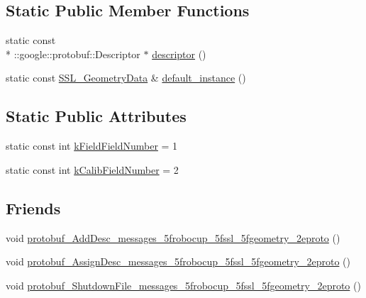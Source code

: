 \subsection*{Static Public Member Functions}
\begin{DoxyCompactItemize}
\item 
static const \\*
\-::google\-::protobuf\-::\-Descriptor $\ast$ \hyperlink{class_s_s_l___geometry_data_a5ea714e17439fd819f87feb567dd0407}{descriptor} ()
\item 
static const \hyperlink{class_s_s_l___geometry_data}{S\-S\-L\-\_\-\-Geometry\-Data} \& \hyperlink{class_s_s_l___geometry_data_a39d6ebf2bf5ca82eacc9150760e9e4fb}{default\-\_\-instance} ()
\end{DoxyCompactItemize}
\subsection*{Static Public Attributes}
\begin{DoxyCompactItemize}
\item 
static const int \hyperlink{class_s_s_l___geometry_data_abc32e65a2a8215fb1c280f4be9dfd3da}{k\-Field\-Field\-Number} = 1
\item 
static const int \hyperlink{class_s_s_l___geometry_data_a62bb45095c6621b4e36730ffcd7377de}{k\-Calib\-Field\-Number} = 2
\end{DoxyCompactItemize}
\subsection*{Friends}
\begin{DoxyCompactItemize}
\item 
void \hyperlink{class_s_s_l___geometry_data_a7d99889adee2c69f6bdd945449284431}{protobuf\-\_\-\-Add\-Desc\-\_\-messages\-\_\-5frobocup\-\_\-5fssl\-\_\-5fgeometry\-\_\-2eproto} ()
\item 
void \hyperlink{class_s_s_l___geometry_data_a1fc037efb8fe2bb0942e88857a9baf62}{protobuf\-\_\-\-Assign\-Desc\-\_\-messages\-\_\-5frobocup\-\_\-5fssl\-\_\-5fgeometry\-\_\-2eproto} ()
\item 
void \hyperlink{class_s_s_l___geometry_data_ac3ccd1382cfb3dfd4eb3eb85981705c6}{protobuf\-\_\-\-Shutdown\-File\-\_\-messages\-\_\-5frobocup\-\_\-5fssl\-\_\-5fgeometry\-\_\-2eproto} ()
\end{DoxyCompactItemize}


